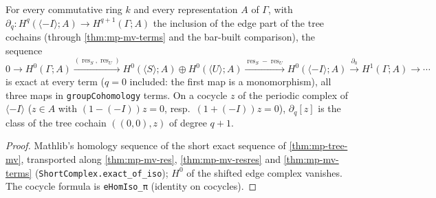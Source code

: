 \begin{theorem}\label{thm:mp-mv-les}
  \leanok
  For every commutative ring $k$ and every representation $A$ of $\Gamma$, with
  $\partial_q\colon H^q(\langle-I\rangle;A)\to H^{q+1}(\Gamma;A)$ the inclusion of the edge part of the tree cochains (through
  \ref{thm:mp-mv-terms} and the bar-built comparison), the sequence
  \[0\to H^0(\Gamma;A)\xrightarrow{(\operatorname{res}_S,\operatorname{res}_U)}H^0(\langle S\rangle;A)\oplus H^0(\langle U\rangle;A)
  \xrightarrow{\operatorname{res}_S-\operatorname{res}_U}H^0(\langle-I\rangle;A)\xrightarrow{\partial_0}H^1(\Gamma;A)\to\cdots\]
  is exact at every term ($q=0$ included: the first map is a monomorphism), all three maps in \texttt{groupCohomology} terms.
  On a cocycle $z$ of the periodic complex of $\langle-I\rangle$ ($z\in A$ with $(1-(-I))z=0$, resp.\ $(1+(-I))z=0$),
  $\partial_q[z]$ is the class of the tree cochain $((0,0),z)$ of degree $q+1$.
\end{theorem}
\begin{proof}
  \leanok
  Mathlib's homology sequence of the short exact sequence of \ref{thm:mp-tree-mv}, transported along
  \ref{thm:mp-mv-res}, \ref{thm:mp-mv-resres} and \ref{thm:mp-mv-terms} (\texttt{ShortComplex.exact\_of\_iso}); $H^0$ of the
  shifted edge complex vanishes.  The cocycle formula is \texttt{eHomIso\_π} (identity on cocycles).
\end{proof}

